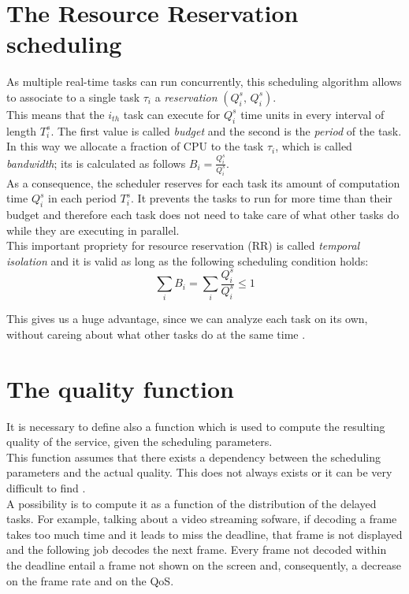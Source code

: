 \section{The Resource Reservation scheduling}
As multiple real-time tasks can run concurrently, this scheduling algorithm allows to associate to a single task \( \tau_{i} \) a \emph{reservation} \( \left(Q_{i}^s,\,Q_{i}^s\right) \).\\ 
This means that the \( i_{th} \) task can execute for \( Q_{i}^s \) time units in every interval of length \( T_{i}^s \). The first value is called \emph{budget} and the second is the \emph{period} of the task.\\
In this way we allocate a fraction of CPU to the task \( \tau_{i} \), which is called \emph{bandwidth}; its is calculated as follows \( B_{i} = \frac{Q_{i}^s}{Q_{i}^s}\).\\
As a consequence, the scheduler reserves for each task its amount of computation time \( Q_{i}^s \) in each period \( T_{i}^s \). It prevents the tasks to run for more time than their budget and therefore each task does not need to take care of what other tasks do while they are executing in parallel.\\
This important propriety for resource reservation (RR) is called \emph{temporal isolation} and it is valid as long as the following scheduling condition holds:
\begin{equation} \tag{1} \label{schedCond}
  \displaystyle\sum_{i} B_{i} =  \displaystyle\sum_{i} \frac{Q_{i}^s}{Q_{i}^s} \leq 1
\end{equation}

This gives us a huge advantage, since we can analyze each task on its own, without careing about what other tasks do at the same time \cite{probGuarantees}.

\section{The quality function}
It is necessary to define also a function which is used to compute the resulting quality of the service, given the scheduling parameters.\\
This function assumes that there exists a dependency between the scheduling parameters and the actual quality. This does not always exists or it can be very difficult to find \cite{prosit}.\\
A possibility is to compute it as a function of the distribution of the delayed tasks. For example, talking about a video streaming sofware, if decoding a frame takes too much time and it leads to miss the deadline, that frame is not displayed and the following job decodes the next frame. Every frame not decoded within the deadline entail a frame not shown on the screen and, consequently, a decrease on the frame rate and on the QoS. 

